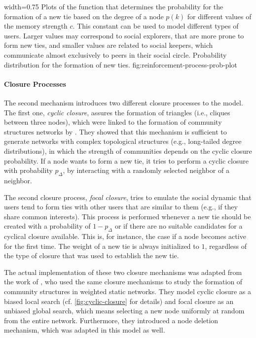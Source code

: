       {width=0.75\textwidth}
      {Plots of the function that determines the probability for the formation of a new tie based on the degree of a node \( p(k) \) for different values of the memory strength \( c \). This constant can be used to model different types of users. Larger values may correspond to social explorers, that are more prone to form new ties, and smaller values are related to social keepers, which communicate almost exclusively to peers in their social circle.}
      {Probability distribution for the formation of new ties.}
      {fig:reinforcement-process-prob-plot}


\paragraph{Closure Processes}
The second mechanism introduces two different closure processes to the model.
The first one, \emph{cyclic closure}, assures the formation of triangles (i.e., cliques between three nodes), which were linked to the formation of community structures networks by \citet{Bianconi2014}.
They showed that this mechanism is sufficient to generate networks with complex topological structures (e.g., long-tailed degree distributions), in which the strength of communities depends on the cyclic closure probability.
If a node wants to form a new tie, it tries to perform a cyclic closure with probability \( p_{\Delta} \), by interacting with a randomly selected neighbor of a neighbor.

The second closure process, \emph{focal closure}, tries to emulate the social dynamic that users tend to form ties with other users that are similar to them (e.g., if they share common interests).
This process is performed whenever a new tie should be created with a probability of \( 1 - p_{\Delta} \) or if there are no suitable candidates for a cyclical closure available.
This is, for instance, the case if a node becomes active for the first time.
The weight of a new tie is always initialized to \( 1 \), regardless of the type of closure that was used to establish the new tie.

The actual implementation of these two closure mechanisms was adapted from the work of \citet{Kumpula2007}, who used the same closure mechanisms to study the formation of community structures in weighted static networks.
They model cyclic closure as a biased local search (cf. \cref{fig:cyclic-closure} for details) and focal closure as an unbiased global search, which means selecting a new node uniformly at random from the entire network.
Furthermore, they introduced a node deletion mechanism, which was adapted in this model as well.


